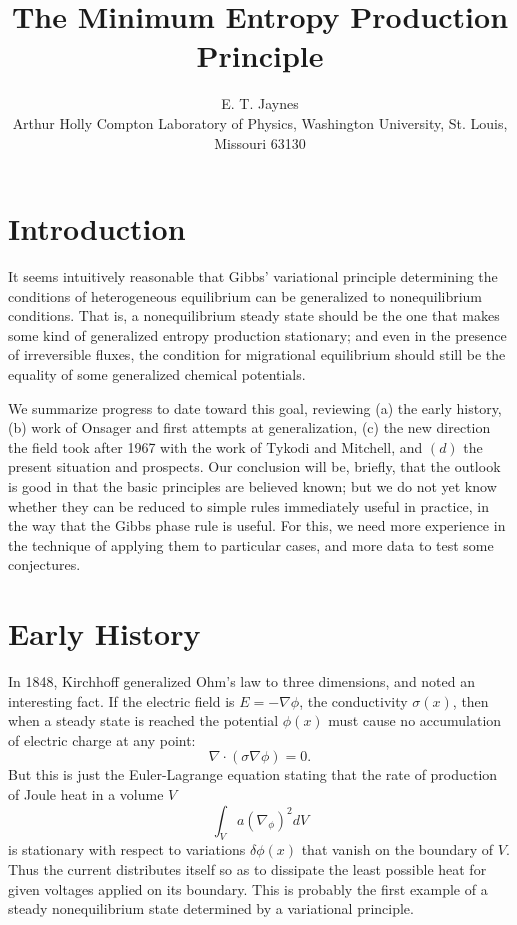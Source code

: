 \documentclass{article}
\title{The Minimum Entropy Production Principle}
\author{E. T. Jaynes\\
Arthur Holly Compton Laboratory of Physics, Washington University, St. Louis, Missouri 63130}
\begin{document}
\maketitle


\section{Introduction}

It seems intuitively reasonable that Gibbs' variational principle determining the conditions of heterogeneous equilibrium can be generalized to nonequilibrium conditions. That is, a nonequilibrium steady state should be the one that makes some kind of generalized entropy production stationary; and even in the presence of irreversible fluxes, the condition for migrational equilibrium should still be the equality of some generalized chemical potentials.

We summarize progress to date toward this goal, reviewing (a) the early history, (b) work of Onsager and first attempts at generalization, (c) the new direction the field took after 1967 with the work of Tykodi and Mitchell, and $(d)$ the present situation and prospects. Our conclusion will be, briefly, that the outlook is good in that the basic principles are believed known; but we do not yet know whether they can be reduced to simple rules immediately useful in practice, in the way that the Gibbs phase rule is useful. For this, we need more experience in the technique of applying them to particular cases, and more data to test some conjectures.

\section{Early History}

In 1848, Kirchhoff \cite{kirchhoff1848} generalized Ohm's law to three dimensions, and noted an interesting fact. If the electric field is $E=-\nabla \phi$, the conductivity $\sigma(x)$, then when a steady state is reached the potential $\phi(x)$ must cause no accumulation of electric charge at any point:
$$
\nabla \cdot(\sigma \nabla \phi)=0.
$$
But this is just the Euler-Lagrange equation stating that the rate of production of Joule heat in a volume $V$
$$
\int_V a\left(\nabla_\phi\right)^2 d V
$$
is stationary with respect to variations $\delta \phi(x)$ that vanish on the boundary of $V$. Thus the current distributes itself so as to dissipate the least possible heat for given voltages applied on its boundary. This is probably the first example of a steady nonequilibrium state determined by a variational principle.
\end{document}
